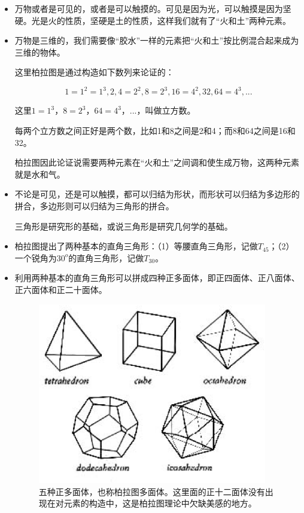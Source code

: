 \begin{itemize}
\item 

万物或者是可见的，或者是可以触摸的。可见是因为光，可以触摸是因为坚硬。光是火的性质，坚硬是土的性质，这样我们就有了“火和土”两种元素。

\item

万物是三维的，我们需要像“胶水”一样的元素把“火和土”按比例混合起来成为三维的物体。

这里柏拉图是通过构造如下数列来论证的：

\begin{equation*}
1=1^2=1^3, 2, 4=2^2, 8=2^3, 16=4^2, 32, 64=4^3,...
\end{equation*}

这里$1=1^3$，$8=2^3$，$64=4^3$，...，叫做立方数。

每两个立方数之间正好是两个数，比如1和8之间是2和4；而8和64之间是16和32。

柏拉图因此论证说需要两种元素在“火和土”之间调和使生成万物，这两种元素就是水和气。

\item

不论是可见，还是可以触摸，都可以归结为形状，而形状可以归结为多边形的拼合，多边形则可以归结为三角形的拼合。

三角形是研究形的基础，或说三角形是研究几何学的基础。

\item

柏拉图提出了两种基本的直角三角形：（1）等腰直角三角形，记做$T_{45}$；（2）一个锐角为$30^o$的直角三角形，记做$T_{30}$。

\item

利用两种基本的直角三角形可以拼成四种正多面体，即正四面体、正八面体、正六面体和正二十面体。

\begin{figure}[htbp]
\begin{center}
\includegraphics[width=10cm]{Preface/platonic-solids.ps}
\caption{五种正多面体，也称柏拉图多面体。这里面的正十二面体没有出现在对元素的构造中，这是柏拉图理论中欠缺美感的地方。}
\end{center}
\end{figure}



\end{itemize}
